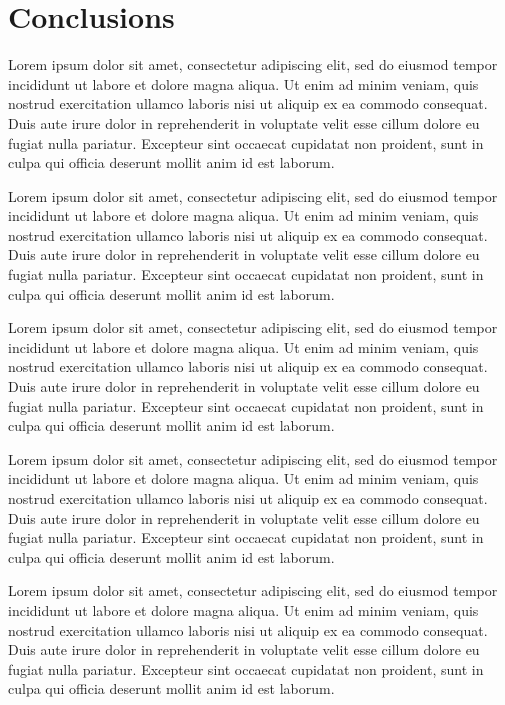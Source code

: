 \documentclass[12pt,a4paper]{article}
\begin{document}
\newpage

\hypertarget{conclusions}{%
\section{Conclusions}\label{conclusions}}

Lorem ipsum dolor sit amet, consectetur adipiscing elit, sed do eiusmod
tempor incididunt ut labore et dolore magna aliqua. Ut enim ad minim
veniam, quis nostrud exercitation ullamco laboris nisi ut aliquip ex ea
commodo consequat. Duis aute irure dolor in reprehenderit in voluptate
velit esse cillum dolore eu fugiat nulla pariatur. Excepteur sint
occaecat cupidatat non proident, sunt in culpa qui officia deserunt
mollit anim id est laborum.

Lorem ipsum dolor sit amet, consectetur adipiscing elit, sed do eiusmod
tempor incididunt ut labore et dolore magna aliqua. Ut enim ad minim
veniam, quis nostrud exercitation ullamco laboris nisi ut aliquip ex ea
commodo consequat. Duis aute irure dolor in reprehenderit in voluptate
velit esse cillum dolore eu fugiat nulla pariatur. Excepteur sint
occaecat cupidatat non proident, sunt in culpa qui officia deserunt
mollit anim id est laborum.

Lorem ipsum dolor sit amet, consectetur adipiscing elit, sed do eiusmod
tempor incididunt ut labore et dolore magna aliqua. Ut enim ad minim
veniam, quis nostrud exercitation ullamco laboris nisi ut aliquip ex ea
commodo consequat. Duis aute irure dolor in reprehenderit in voluptate
velit esse cillum dolore eu fugiat nulla pariatur. Excepteur sint
occaecat cupidatat non proident, sunt in culpa qui officia deserunt
mollit anim id est laborum.

Lorem ipsum dolor sit amet, consectetur adipiscing elit, sed do eiusmod
tempor incididunt ut labore et dolore magna aliqua. Ut enim ad minim
veniam, quis nostrud exercitation ullamco laboris nisi ut aliquip ex ea
commodo consequat. Duis aute irure dolor in reprehenderit in voluptate
velit esse cillum dolore eu fugiat nulla pariatur. Excepteur sint
occaecat cupidatat non proident, sunt in culpa qui officia deserunt
mollit anim id est laborum.

Lorem ipsum dolor sit amet, consectetur adipiscing elit, sed do eiusmod
tempor incididunt ut labore et dolore magna aliqua. Ut enim ad minim
veniam, quis nostrud exercitation ullamco laboris nisi ut aliquip ex ea
commodo consequat. Duis aute irure dolor in reprehenderit in voluptate
velit esse cillum dolore eu fugiat nulla pariatur. Excepteur sint
occaecat cupidatat non proident, sunt in culpa qui officia deserunt
mollit anim id est laborum.
\end{document}
